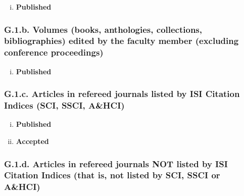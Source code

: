 \documentclass[12pt]{article}
\begin{document}
{{\begin{enumerate}[i)]
\item {\bf Published}  %
\end{enumerate}

\subsubsection*{G.1.b. Volumes (books, anthologies, collections, bibliographies) edited by the faculty member (excluding conference proceedings)}


\begin{enumerate}[i)]
\item {\bf Published}  %
\end{enumerate}



\subsubsection*{G.1.c. Articles in refereed journals listed by ISI Citation Indices (SCI, SSCI, A\&HCI)}


\begin{enumerate}[i)]
\item {\bf Published} %

\item {\bf Accepted} %
\end{enumerate}

\subsubsection*{G.1.d. Articles in refereed journals NOT listed by ISI Citation Indices (that is, not listed by SCI, SSCI or A\&HCI)}
 
}}
\end{document}
